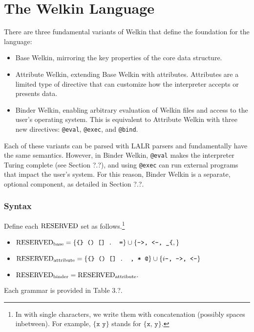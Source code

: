 \section{The Welkin Language}

There are three fundamental variants of Welkin that define the foundation for the language:
\begin{itemize}
	\item Base Welkin, mirroring the key properties of the core data structure.
	\item Attribute Welkin, extending Base Welkin with attributes. Attributes are a limited type of directive that can customize how the interpreter accepts or presents data.
	\item Binder Welkin, enabling arbitrary evaluation of Welkin files and access to the user's operating system. This is equivalent to Attribute Welkin with three new directives: \texttt{@eval}, \texttt{@exec}, and \texttt{@bind}. \end{itemize}
Each of these variants can be parsed with LALR parsers and fundamentally have the same semantics. However, in Binder Welkin, \texttt{@eval} makes the interpreter Turing complete (see Section ?.?), and using \texttt{@exec} can run external programs that impact the user's system. For this reason, Binder Welkin is a separate, optional component, as detailed in Section ?.?.

\subsubsection*{Syntax}
\label{section:syntax}
Define each $\mathrm{RESERVED}$ set as follows.\footnote{In with single characters, we write them with concatenation (possibly spaces inbetween). For example, $\{\texttt{x y}\}$ stands for $\{\texttt{x, y}\}.$}
\begin{itemize}
\item $\mathrm{RESERVED}_{\textrm{base}} = \{\texttt{\{\} () [] . =}\} \cup \{\texttt{->, <-, \_\{},\} $
  \item $\mathrm{RESERVED}_{\textrm{attribute}} = \{\texttt{\{\} () [] . , * @}\} \cup \{i\texttt{--, ->, <-}\}$ %
\item $\mathrm{RESERVED}_{\textrm{binder}} = \mathrm{RESERVED}_{\textrm{attribute}}.$
\end{itemize}
Each grammar is provided in Table 3.?.

